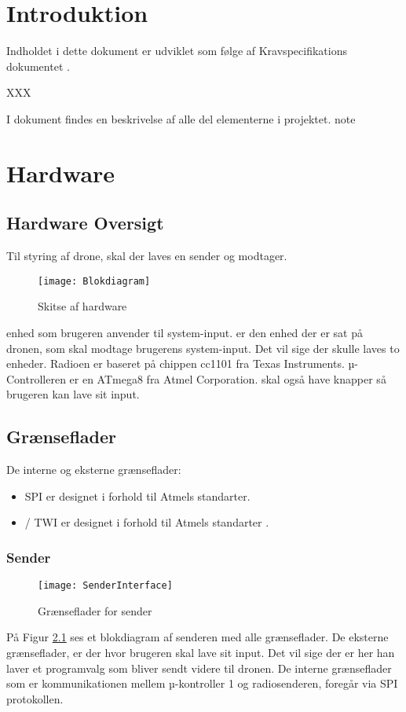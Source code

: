 \documentclass[Main]{subfiles}
\begin{document}
\chapter{Introduktion}
Indholdet i dette dokument er udviklet som følge af Kravspecifikations dokumentet \cite{KravSpec}.

XXX

I dokument findes en beskrivelse af alle del elementerne i projektet. \fixme note

\chapter{Hardware}

\section{Hardware Oversigt}

Til styring af drone, skal der laves en sender og modtager.

\begin{figure}[H]
\centering
\texttt{[image: Blokdiagram]}
\caption{Skitse af hardware}
\end{figure}

 enhed som brugeren anvender til system-input.
 er den enhed der er sat på dronen, som skal modtage brugerens system-input.
Det vil sige der skulle laves to enheder. 
Radioen er baseret på chippen cc1101\cite{cc1101} fra Texas Instruments. 
µ-Controlleren er en ATmega8 fra Atmel Corporation.
 skal også have knapper så brugeren kan lave sit input.

\section{Grænseflader}
De interne og eksterne grænseflader:
\begin{itemize}
\item SPI er designet i forhold til Atmels standarter\cite{SPI}.
\item \itoc / TWI er designet i forhold til Atmels standarter \cite{Twi}.
\end{itemize}



\subsection{Sender}
\begin{figure}[H]
\centering
\texttt{[image: SenderInterface]}
\caption{Grænseflader for sender}
\label{fig: SenderInterface}
\end{figure}
På Figur \ref{fig: SenderInterface} ses et blokdiagram af senderen med alle grænseflader.
De eksterne grænseflader, er der hvor brugeren skal lave sit input. Det vil sige der er her han laver et programvalg som bliver sendt videre til dronen.
De interne grænseflader som er kommunikationen mellem µ-kontroller 1 og radiosenderen, foregår via SPI protokollen. 
\end{document}
